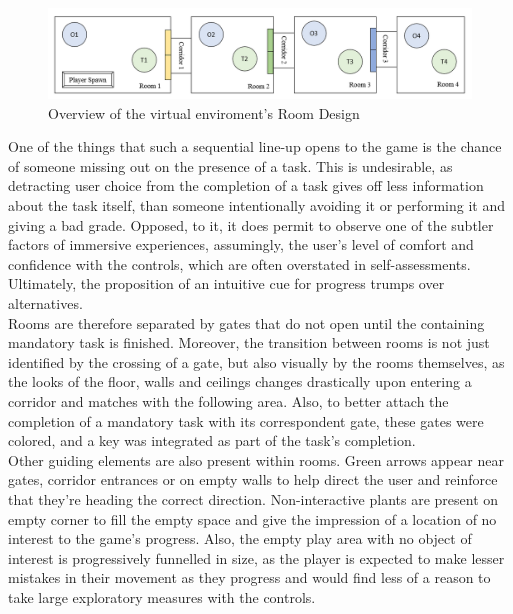     \begin{figure}[ht]
        \centering
        \hspace*{-1cm}
        \includegraphics[width=0.8\paperwidth]{figures/RoomOverview.png}
        \caption{\label{fig:FigureRooms}Overview of the virtual enviroment's Room Design}
    \end{figure}

    One of the things that such a sequential line-up opens to the game is the chance of someone missing out on the presence of a task. This is undesirable, as detracting user choice from the completion of a task gives off less information about the task itself, than someone intentionally avoiding it or performing it and giving a bad grade. Opposed, to it, it does permit to observe one of the subtler factors of immersive experiences, assumingly, the user’s level of comfort and confidence with the controls, which are often overstated in self-assessments. Ultimately, the proposition of an intuitive cue for progress trumps over alternatives.\\
    Rooms are therefore separated by gates that do not open until the containing mandatory task is finished. Moreover, the transition between rooms is not just identified by the crossing of a gate, but also visually by the rooms themselves, as the looks of the floor, walls and ceilings changes drastically upon entering a corridor and matches with the following area. Also, to better attach the completion of a mandatory task with its correspondent gate, these gates were colored, and a key was integrated as part of the task’s completion.\\
    Other guiding elements are also present within rooms. Green arrows appear near gates, corridor entrances or on empty walls to help direct the user and reinforce that they’re heading the correct direction. Non-interactive plants are present on empty corner to fill the empty space and give the impression of a location of no interest to the game’s progress. Also, the empty play area with no object of interest is progressively funnelled in size, as the player is expected to make lesser mistakes in their movement as they progress and would find less of a reason to take large exploratory measures with the controls.\\ 
